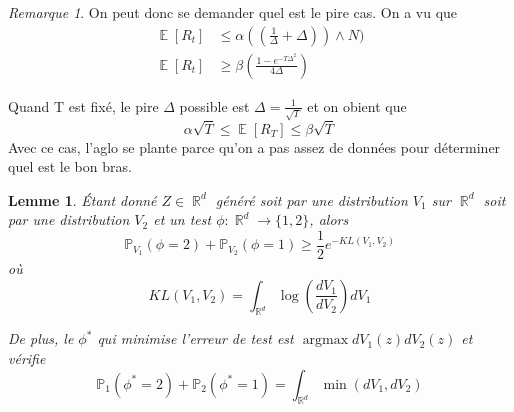 \documentclass{article}
\DeclareMathOperator*{\argmax}{argmax}
\DeclareMathOperator*{\E}{\mathbb{E}}
\DeclareMathOperator*{\R}{\mathbb{R}}
\newtheorem{lemma}{Lemme}[section]
\theoremstyle{remark}
\theoremstyle{remark}
\newtheorem{remark}{Remarque}[section]
\begin{document}
\begin{remark}
  On peut donc se demander quel est le pire cas. On a vu que
  \begin{align*}
    \E[R_t] &\leq \alpha((\frac{1}{\Delta} + \Delta))\wedge N) \\
    \E[R_t] &\geq \beta(\frac{1-e^{-T\Delta^2}}{4\Delta})
  \end{align*}

  Quand T est fixé, le pire $\Delta$ possible est $\Delta = \frac{1}{\sqrt{T}}$ et on obient que
  $$
  \alpha \sqrt{T} \leq \E[R_T] \leq \beta \sqrt{T}
  $$
  Avec ce cas, l'aglo se plante parce qu'on a pas assez de données pour déterminer quel est le bon bras.
\end{remark}

\begin{lemma}
  \label{lem:test_phi}
  Étant donné $Z \in \R^d$ généré soit par une distribution $V_1$ sur $\R^d$ soit par une distribution $V_2$ et un test $\phi: \R^d \to \{1,2\}$, alors
  $$
  \mathbb{P}_{V_1}(\phi = 2) + \mathbb{P}_{V_2}(\phi = 1) \geq \frac{1}{2} e^{-KL(V_1,V_2)}
  $$
  où $$KL(V_1, V_2) = \int_{\R^d} \log(\frac{dV_1}{dV_2}) dV_1 $$

  De plus, le $\phi^*$ qui minimise l'erreur de test est $\argmax dV_1(z) dV_2(z)$ et vérifie
  $$
  \mathbb{P}_1(\phi^*=2) + \mathbb{P}_2(\phi^*=1) = \int_{\R^d} \min(dV_1,dV_2)
  $$
\end{lemma}
\end{document}
